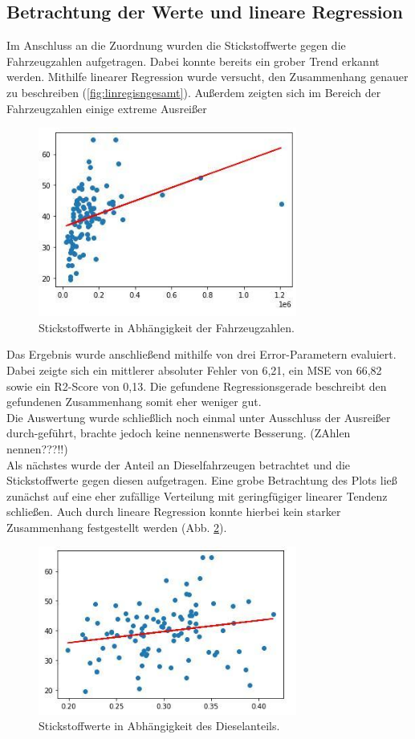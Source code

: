 \documentclass[11pt,a4paper,oneside,german]{article}
\begin{document}
	\subsection{Betrachtung der Werte und lineare Regression}
	
	Im Anschluss an die Zuordnung wurden die Stickstoffwerte gegen die Fahrzeugzahlen aufgetragen. Dabei konnte bereits ein grober Trend erkannt werden. Mithilfe linearer Regression wurde versucht, den Zusammenhang genauer zu beschreiben (\ref{fig:linregisngesamt}). Außerdem zeigten sich im Bereich der Fahrzeugzahlen einige extreme Ausreißer
	
	\begin{figure}[h!]
		\centering
		\includegraphics[width=8.5cm]{linreginsgesamt.jpg}
		\caption{Stickstoffwerte in Abhängigkeit der Fahrzeugzahlen.}
		\label{fig:linreginsgesamt}
	\end{figure}
	
	Das Ergebnis wurde anschließend mithilfe von drei Error-Parametern evaluiert. Dabei zeigte sich ein mittlerer absoluter Fehler von 6,21, ein MSE von 66,82 sowie ein R2-Score von 0,13. Die gefundene Regressionsgerade beschreibt den gefundenen Zusammenhang somit eher weniger gut. \\
	Die Auswertung wurde schließlich noch einmal unter Ausschluss der Ausreißer durch-geführt, brachte jedoch keine nennenswerte Besserung. (ZAhlen nennen???!!) \\
	Als nächstes wurde der Anteil an Dieselfahrzeugen betrachtet und die Stickstoffwerte gegen diesen aufgetragen. Eine grobe Betrachtung des Plots ließ zunächst auf eine eher zufällige Verteilung mit geringfügiger linearer Tendenz schließen. Auch durch lineare Regression konnte hierbei kein starker Zusammenhang festgestellt werden (Abb. \ref{fig:linregdieselanteil}).
	
	\begin{figure}[h!]
		\centering
		\includegraphics[width=8.5cm]{linregdieselanteil.jpg}
		\caption{Stickstoffwerte in Abhängigkeit des Dieselanteils.}
		\label{fig:linregdieselanteil}
	\end{figure}
	
\end{document}
